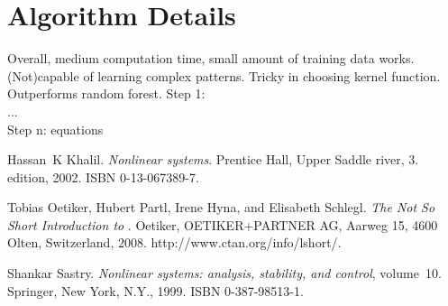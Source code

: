 \documentclass[a4paper,12pt,oneside,onecolumn]{article} %
\begin{document}
\section*{Algorithm Details}
Overall, medium computation time, small amount of training data works. (Not)capable of learning complex patterns. Tricky in choosing kernel function. Outperforms random forest.
Step 1:\\
...\\
Step n:
equations


\begin{thebibliography}{99}
Hassan~K Khalil.
\newblock \emph{Nonlinear systems}.
\newblock Prentice Hall, Upper Saddle river, 3. edition, 2002.
\newblock ISBN 0-13-067389-7.

Tobias Oetiker, Hubert Partl, Irene Hyna, and Elisabeth Schlegl.
\newblock \emph{The Not So Short Introduction to \LaTeXe}.
\newblock Oetiker, OETIKER+PARTNER AG, Aarweg 15, 4600 Olten, Switzerland,
  2008.
\newblock http://www.ctan.org/info/lshort/.

Shankar Sastry.
\newblock \emph{Nonlinear systems: analysis, stability, and control},
  volume~10.
\newblock Springer, New York, N.Y., 1999.
\newblock ISBN 0-387-98513-1.
\end{thebibliography}
\end{document}
